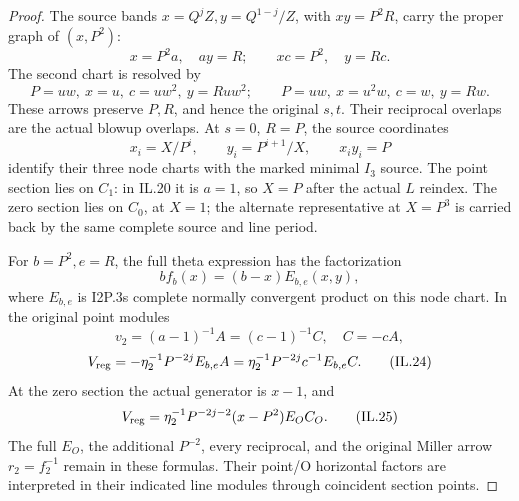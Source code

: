\begin{proof}
\par\nobreak

The source bands \(x=Q^jZ,y=Q^{1-j}/Z\), with \(xy=P^2R\),
carry the proper graph of \((x,P^2)\):
\[
 x=P^2a,\quad ay=R;\qquad xc=P^2,\quad y=Rc.
 \tag{IL.20}
\]
The second chart is resolved by
\[
 P=uw,\ x=u,\ c=uw^2,\ y=Ruw^2;\qquad
 P=uw,\ x=u^2w,\ c=w,\ y=Rw.
 \tag{IL.21}
\]
These arrows preserve \(P,R\), and hence the original \(s,t\).
Their reciprocal overlaps are the actual blowup overlaps. At
\(s=0\), \(R=P\), the source coordinates
\[
       x_i=X/P^i,\qquad y_i=P^{i+1}/X,\qquad x_iy_i=P
 \tag{IL.22}
\]
identify their three node charts with the marked minimal
\(I_3\) source. The point section lies on \(C_1\): in IL.20
it is \(a=1\), so \(X=P\) after the actual \(L\) reindex.
The zero section lies on \(C_0\), at \(X=1\); the alternate
representative at \(X=P^3\) is carried back by the same complete
source and line period.

For \(b=P^2,e=R\), the full theta expression has the factorization
\[
 b f_b(x)=(b-x)E_{b,e}(x,y),
 \tag{IL.23}
\]
where \(E_{b,e}\) is I2P.3\textquotesingle s complete normally convergent product
on this node chart. In the original point modules
\[
 v_2=(a-1)^{-1}A=(c-1)^{-1}C,\quad C=-cA,
\]
\[
 V_{\rm reg}=-\eta_2^{-1}P^{-2j}E_{b,e}A
     =\eta_2^{-1}P^{-2j}c^{-1}E_{b,e}C .
 \tag{IL.24}
\]
At the zero section the actual generator is \(x-1\), and
\[
 V_{\rm reg}=\eta_2^{-1}P^{-2j-2}(x-P^2)E_OC_O.
 \tag{IL.25}
\]
The full \(E_O\), the additional \(P^{-2}\), every reciprocal,
and the original Miller arrow \(r_2=f_2^{-1}\) remain in these
formulas. Their point/O horizontal factors are interpreted in
their indicated line modules through coincident section points.


\end{proof}
